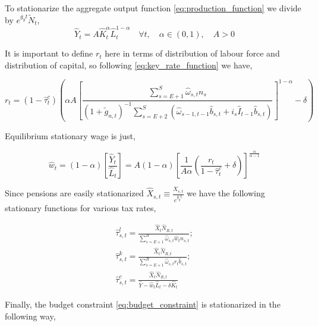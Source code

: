 To stationarize the aggregate output function \textcolor{Fuchsia}{\eqref{eq:production_function}} we divide by $e^{g_y t}\tilde{N}_t$,
\begin{equation}\label{eq:production_stat}
    \hat{Y}_t=A\hat{K}_t^{\alpha}\hat{L}_t^{1-\alpha} \quad \forall t, \quad \alpha \in (0, 1), \quad A>0
\end{equation}

It is important to define $r_t$ here in terms of distribution of labour force and distribution of capital, so following \textcolor{Fuchsia}{\eqref{eq:key_rate_function}} we have,

\begin{equation}\label{eq:key_rate_explicit}
    r_t = (1-\hat{\tau}^c_t)\left( \alpha A \left[
    \frac{
        \textstyle \sum_{s=E+1}^{S} \hat{\omega}_{s,t} n_s
    }{
        \textstyle (1+\tilde{g}_{n,t})^{-1} \sum_{s=E+2}^{S} \left( \hat{\omega}_{s-1,t-1} \hat{b}_{s,t} + i_s \hat{I}_{t-1} \hat{b}_{s,t} \right)
    }
\right]^{1-\alpha} - \delta \right)
\end{equation}

Equilibrium stationary wage is just,

\begin{equation}\label{eq:wage_stat}
    \hat{w}_t=(1-\alpha) \left[ \frac{\hat{Y}_t}{\hat{L}_t} \right] = A(1-\alpha) \left[ \frac{1}{A\alpha} \left( \frac{r_t}{1-\hat{\tau}^c_t} +\delta \right) \right]^{\frac{\alpha}{\alpha-1}}
\end{equation}

Since pensions are easily stationarized $\hat{X}_{s,t}\equiv\frac{X_{s,t}}{e^{g_y t}}$ we have the following stationary functions for various tax rates,

\begin{equation}\label{eq:tax_rates_stat}
    \begin{aligned}
        \hat{\tau}^l_{s,t}=\frac{\hat{X}_t \hat{N}_{R,t}}{\sum^R_{s=E+1}\hat{\omega}_{s,t} \hat{w}_t n_{s,t}};
        \\
        \hat{\tau}^k_{s,t} = \frac{\hat{X}_t \hat{N}_{R,t}}{\sum^R_{s=E+1}\hat{\omega}_{s,t} r_t \hat{b}_{s,t}};
        \\
        \hat{\tau}^c_{s,t} = \frac{\hat{X}_t \hat{N}_{R,t}}{\hat{Y} - \hat{w}_t \hat{L}_t - \delta \hat{K}_t}
    \end{aligned}
\end{equation}

Finally, the budget constraint \textcolor{Fuchsia}{\eqref{eq:budget_constraint}} is stationarized in the following way,

